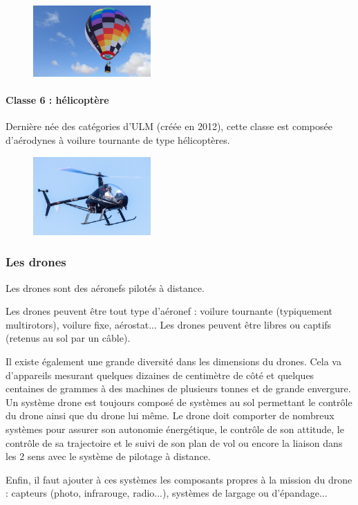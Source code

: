 	\begin{figure}[H]
  	\centering
    \includegraphics[width=0.4\textwidth]{01-EtudeAeronefs/img/ULM_Classe_5.jpg}
	\end{figure}	
		
	\paragraph{Classe 6 : hélicoptère}	
	Dernière née des catégories d'ULM (créée en 2012), cette classe est composée d'aérodynes à voilure tournante de type hélicoptères.
	
	\begin{figure}[H]
  	\centering
    \includegraphics[width=0.4\textwidth]{01-EtudeAeronefs/img/ULM_Classe_6.jpg}
	\end{figure}


\subsubsection{Les drones}
Les drones sont des aéronefs pilotés à distance. 

Les drones peuvent être tout type d'aéronef : voilure tournante (typiquement multirotors), voilure fixe, aérostat... Les drones peuvent être libres ou captifs (retenus au sol par un câble).

Il existe également une grande diversité dans les dimensions du drones. Cela va d'appareils mesurant quelques dizaines de centimètre de côté et quelques centaines de grammes à des machines de plusieurs tonnes et de grande envergure. \\

Un système drone est toujours composé de systèmes au sol permettant le contrôle du drone ainsi que du drone lui même. Le drone doit comporter de nombreux systèmes pour assurer son autonomie énergétique, le contrôle de son attitude, le contrôle de sa trajectoire et le suivi de son plan de vol ou encore la liaison dans les 2 sens avec le système de pilotage à distance. 

Enfin, il faut ajouter à ces systèmes les composants propres à la mission du drone : capteurs (photo, infrarouge, radio...), systèmes de largage ou d'épandage...
